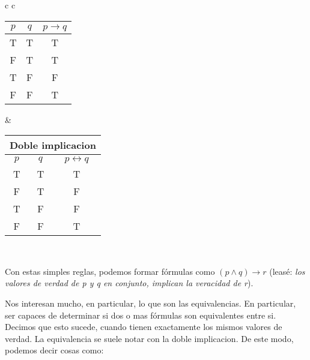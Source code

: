 \documentclass{article}
\begin{document}
\begin{center}
\begin{tabular}{c c}
\begin{tabular}{|c|c|c|}
	\hline
	$p$ & $q$ & $p \longrightarrow q$\\
	\hline
    T & T & T\\
	\hline
    F & T & T\\
    \hline
    T & F & F\\
    \hline
    F & F & T\\
    \hline
\end{tabular} &


\begin{tabular}{|c|c|c|}

	\multicolumn{3}{c}{\textbf{Doble implicacion}} \\

	\hline
	$p$ & $q$ & $p \longleftrightarrow q$\\
	\hline
    T & T & T\\
	\hline
    F & T & F\\
    \hline
    T & F & F\\
    \hline
    F & F & T\\
    \hline
\end{tabular} \\

\end{tabular}
\end{center}

Con estas simples reglas, podemos formar fórmulas como $(p \land q) \longrightarrow r$ (leasé: \textit{los valores de verdad de p y q en conjunto, implican la veracidad de r}).

Nos interesan mucho, en particular, lo que son las equivalencias. En particular, ser capaces de determinar si dos o mas fórmulas son equivalentes entre si. Decimos que esto sucede, cuando tienen exactamente los mismos valores de verdad. La equivalencia se suele notar con la doble implicacion. De este modo, podemos decir cosas como:
\end{document}
